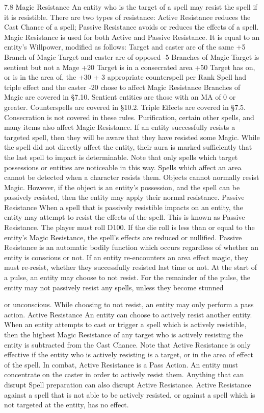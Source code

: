 \documentclass[a4paper]{article}
\begin{document}
\begin{multicols}{3}
7.8 Magic Resistance
An entity who is the target of a spell may resist the
spell if it is resistible. There are two types of resistance: Active Resistance reduces the Cast Chance
of a spell; Passive Resistance avoids or reduces the
effects of a spell. Magic Resistance is used for both
Active and Passive Resistance. It is equal to an
entity’s Willpower, modified as follows:
Target and caster are of the same
+5
Branch of Magic
Target and caster are of opposed
-5
Branches of Magic
Target is sentient but not a Mage
+20
Target is in a consecrated area
+50
Target has on, or is in the area of, the +30 + 3
appropriate counterspell
per Rank
Spell had triple effect and the caster
-20
chose to affect Magic Resistance
Branches of Magic are covered in §7.10. Sentient
entities are those with an MA of 0 or greater.
Counterspells are covered in §10.2. Triple Effects
are covered in §7.5. Consecration is not covered in
these rules.
Purification, certain other spells, and many items
also affect Magic Resistance.
If an entity successfully resists a targeted spell,
then they will be aware that they have resisted
some Magic. While the spell did not directly affect
the entity, their aura is marked sufficiently that the
last spell to impact is determinable. Note that only
spells which target possessions or entities are noticeable in this way. Spells which affect an area
cannot be detected when a character resists them.
Objects cannot normally resist Magic. However, if
the object is an entity’s possession, and the spell
can be passively resisted, then the entity may apply
their normal resistance.
Passive Resistance
When a spell that is passively resistible impacts on
an entity, the entity may attempt to resist the effects of the spell. This is known as Passive Resistance. The player must roll D100. If the die roll is
less than or equal to the entity’s Magic Resistance,
the spell’s effects are reduced or nullified. Passive
Resistance is an automatic bodily function which
occurs regardless of whether an entity is conscious
or not. If an entity re-encounters an area effect
magic, they must re-resist, whether they successfully resisted last time or not. At the start of a
pulse, an entity may choose to not resist. For the
remainder of the pulse, the entity may not passively resist any spells, unless they become stunned

or unconscious. While choosing to not resist, an
entity may only perform a pass action.
Active Resistance
An entity can choose to actively resist another
entity. When an entity attempts to cast or trigger a
spell which is actively resistible, then the highest
Magic Resistance of any target who is actively
resisting the entity is subtracted from the Cast
Chance. Note that Active Resistance is only effective if the entity who is actively resisting is a target, or in the area of effect of the spell. In combat,
Active Resistance is a Pass Action. An entity must
concentrate on the caster in order to actively resist
them. Anything that can disrupt Spell preparation
can also disrupt Active Resistance. Active Resistance against a spell that is not able to be actively
resisted, or against a spell which is not targeted at
the entity, has no effect.


\end{multicols}
\end{document}
